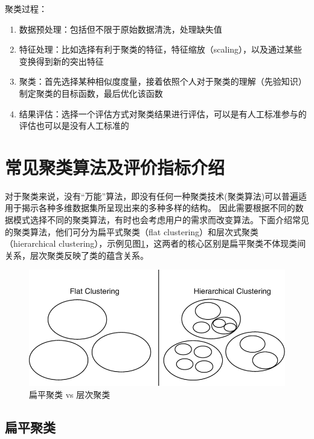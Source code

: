 聚类过程：
\begin{enumerate}
    \item 数据预处理：包括但不限于原始数据清洗，处理缺失值 
    \item 特征处理：比如选择有利于聚类的特征，特征缩放（scaling），以及通过某些变换得到新的突出特征
    \item 聚类：首先选择某种相似度度量，接着依照个人对于聚类的理解（先验知识）制定聚类的目标函数，最后优化该函数
    \item 结果评估：选择一个评估方式对聚类结果进行评估，可以是有人工标准参与的评估也可以是没有人工标准的
\end{enumerate} 


\section{常见聚类算法及评价指标介绍}
对于聚类来说，没有“万能”算法，即没有任何一种聚类技术(聚类算法)可以普遍适用于揭示各种多维数据集所呈现出来的多种多样的结构。
因此需要根据不同的数据模式选择不同的聚类算法，有时也会考虑用户的需求而改变算法。下面介绍常见的聚类算法，他们可分为扁平式聚类（flat clustering）和层次式聚类（hierarchical clustering），示例见图\ref{fig: cluster_taxonomy}，这两者的核心区别是扁平聚类不体现类间关系，层次聚类反映了类的蕴含关系。

\begin{figure}[h]
    \includegraphics[scale=.4]{pic/394318_1_En_9_Fig6_HTML.png}
    \caption{扁平聚类 vs 层次聚类}
    \label{fig: cluster_taxonomy}
\end{figure}

\subsection{扁平聚类}

